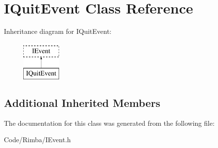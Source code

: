 \hypertarget{class_i_quit_event}{}\section{I\+Quit\+Event Class Reference}
\label{class_i_quit_event}
Inheritance diagram for I\+Quit\+Event\+:\begin{figure}[H]
\begin{center}
\leavevmode
\includegraphics[height=2.000000cm]{class_i_quit_event}
\end{center}
\end{figure}
\subsection*{Additional Inherited Members}


The documentation for this class was generated from the following file\+:\begin{DoxyCompactItemize}
\item 
Code/\+Rimba/I\+Event.\+h\end{DoxyCompactItemize}
